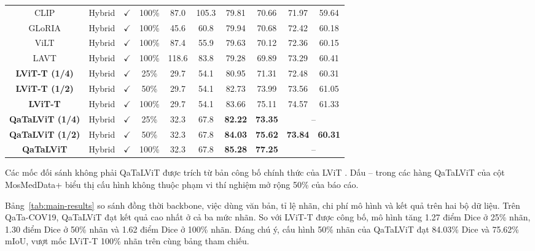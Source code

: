 \begin{table}[!t]
{\begin{tabular}{cccccccccc}
    \rowcolor{yellow!10} CLIP & Hybrid & $\checkmark$ & 100\% & 87.0 & 105.3 & 79.81 & 70.66 & 71.97 & 59.64 \\
    \rowcolor{yellow!10} GLoRIA & Hybrid & $\checkmark$ & 100\% & 45.6 & 60.8 & 79.94 & 70.68 & 72.42 & 60.18 \\
    \rowcolor{yellow!10} ViLT & Hybrid & $\checkmark$ & 100\% & 87.4 & 55.9 & 79.63 & 70.12 & 72.36 & 60.15 \\
    \rowcolor{yellow!10} LAVT & Hybrid & $\checkmark$ & 100\% & 118.6 & 83.8 & 79.28 & 69.89 & 73.29 & 60.41 \\
    \hline
    \rowcolor{yellow!15} \textbf{LViT-T (1/4)} & Hybrid & $\checkmark$ & 25\% & 29.7 & 54.1 & 80.95 & 71.31 & 72.48 & 60.31 \\
    \rowcolor{yellow!15} \textbf{LViT-T (1/2)} & Hybrid & $\checkmark$ & 50\% & 29.7 & 54.1 & 82.73 & 73.99 & 73.56 & 61.05 \\
    \rowcolor{yellow!15} \textbf{LViT-T} & Hybrid & $\checkmark$ & 100\% & 29.7 & 54.1 & 83.66 & 75.11 & 74.57 & 61.33 \\
    \hline
    \rowcolor{blue!8} \textbf{QaTaLViT (1/4)} & Hybrid & $\checkmark$ & 25\% & 32.3 & 67.8 & \textbf{82.22} & \textbf{73.35} & \multicolumn{2}{c}{--} \\
    \rowcolor{blue!8} \textbf{QaTaLViT (1/2)} & Hybrid & $\checkmark$ & 50\% & 32.3 & 67.8 & \textbf{84.03} & \textbf{75.62} & \textbf{73.84} & \textbf{60.31} \\
    \rowcolor{blue!8} \textbf{QaTaLViT} & Hybrid & $\checkmark$ & 100\% & 32.3 & 67.8 & \textbf{85.28} & \textbf{77.25} & \multicolumn{2}{c}{--} \\
    \hline
  \end{tabular}%
  }
\tablenotesep
\begin{minipage}{0.98\textwidth}
\scriptsize
Các mốc đối sánh không phải QaTaLViT được trích từ bản công bố chính thức của LViT \cite{li2023lvit}. Dấu -- trong các hàng QaTaLViT của cột MosMedData+ biểu thị cấu hình không thuộc phạm vi thí nghiệm mở rộng 50\% của báo cáo.
\end{minipage}
\end{table}

Bảng~\ref{tab:main-results} so sánh đồng thời backbone, việc dùng văn bản, tỉ lệ nhãn, chi phí mô hình và kết quả trên hai bộ dữ liệu. Trên QaTa-COV19, QaTaLViT đạt kết quả cao nhất ở cả ba mức nhãn. So với LViT-T được công bố, mô hình tăng 1.27 điểm Dice ở 25\% nhãn, 1.30 điểm Dice ở 50\% nhãn và 1.62 điểm Dice ở 100\% nhãn. Đáng chú ý, cấu hình 50\% nhãn của QaTaLViT đạt 84.03\% Dice và 75.62\% mIoU, vượt mốc LViT-T 100\% nhãn trên cùng bảng tham chiếu.

